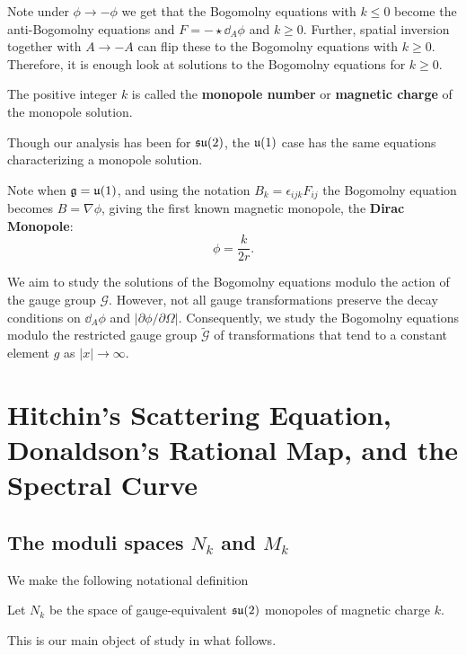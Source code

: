 	Note under $\phi \to -\phi$ we get that the Bogomolny equations with $k \leq 0$ become the anti-Bogomolny equations and $F = -\star \dd_A \phi$ and $k \geq 0$. Further, spatial inversion together with $A\to-A$ can flip these to the Bogomolny equations with $k \geq 0$. Therefore, it is enough look at solutions to the Bogomolny equations for $k \geq 0$.
	
	\begin{defn}
		The positive integer $k$ is called the \textbf{monopole number} or \textbf{magnetic charge} of the monopole solution.
	\end{defn}
	
	Though our analysis has been for $\frak{su}(2)$, the $\frak{u}(1)$ case has the same equations characterizing a monopole solution.
	\begin{obs}
		Note when $\frak g = \frak u(1)$, and using the notation $B_k = \epsilon_{ijk} F_{ij}$ the Bogomolny equation becomes $B = \nabla \phi$, giving the first known magnetic monopole, the \textbf{Dirac Monopole}:
		\begin{equation*}
			\phi = \frac{k}{2r}.
		\end{equation*}
	\end{obs}
	
	\begin{nb}
		We aim to study the solutions of the Bogomolny equations modulo the action of the gauge group $\mathcal G$. However, not all gauge transformations preserve the decay conditions on $\dd_A \phi$ and $|\partial \phi/\partial \Omega|$. Consequently, we study the Bogomolny equations modulo the restricted gauge group $\tilde{\mathcal G}$ of transformations that tend to a constant element $g$ as $|x| \to \infty$.
	\end{nb}
	
	
	\section{Hitchin's Scattering Equation, Donaldson's Rational Map, and the Spectral Curve}
	
	\subsection{The moduli spaces $N_k$ and $M_k$}
	
	We make the following notational definition
	\begin{defn}
		Let $N_k$ be the space of gauge-equivalent $\frak{su}(2)$ monopoles of magnetic charge $k$.
	\end{defn}
	This is our main object of study in what follows.
	
